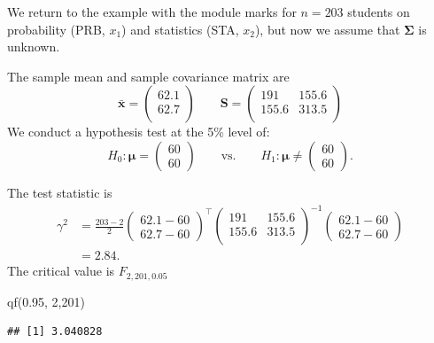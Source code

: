 \documentclass[
]{book}
\newenvironment{Shaded}{\begin{snugshade}}{\end{snugshade}}
\newcommand{\DecValTok}[1]{\textcolor[rgb]{0.00,0.00,0.81}{#1}}
\newcommand{\FloatTok}[1]{\textcolor[rgb]{0.00,0.00,0.81}{#1}}
\newcommand{\FunctionTok}[1]{\textcolor[rgb]{0.00,0.00,0.00}{#1}}
\newcommand{\NormalTok}[1]{#1}
\theoremstyle{definition}
\theoremstyle{definition}
\theoremstyle{definition}
\theoremstyle{definition}
\theoremstyle{remark}
\begin{document}
We return to the example with the module marks for \(n=203\) students on probability (PRB, \(x_1\)) and statistics (STA, \(x_2\)), but now we assume that \(\boldsymbol{\Sigma}\) is unknown.

The sample mean and sample covariance matrix are
\[\bar{\mathbf x} = \begin{pmatrix}62.1 \\62.7 \\\end{pmatrix} \qquad \mathbf S= \begin{pmatrix}191&155.6 \\155.6&313.5 \\\end{pmatrix}\]
We conduct a hypothesis test at the 5\% level of:
\[H_0: {\boldsymbol{\mu}}= \begin{pmatrix} 60 \\ 60 \end{pmatrix} \qquad \text{vs.} \qquad H_1: {\boldsymbol{\mu}}\neq \begin{pmatrix} 60 \\ 60 \end{pmatrix}.\]

The test statistic is
\begin{align*}
\gamma^2 &= \frac{203-2}{2} \begin{pmatrix} 62.1 - 60 \\ 62.7 - 60 \end{pmatrix}^\top \begin{pmatrix}191&155.6 \\155.6&313.5 \\\end{pmatrix}^{-1} \begin{pmatrix} 62.1 - 60 \\ 62.7 - 60 \end{pmatrix} \\
 &= 2.84.
\end{align*}
The critical value is \(F_{2,201,0.05}\)

\begin{Shaded}
\begin{Highlighting}[]
 \FunctionTok{qf}\NormalTok{(}\FloatTok{0.95}\NormalTok{, }\DecValTok{2}\NormalTok{,}\DecValTok{201}\NormalTok{)}
\end{Highlighting}
\end{Shaded}

\begin{verbatim}
## [1] 3.040828
\end{verbatim}
\end{document}
